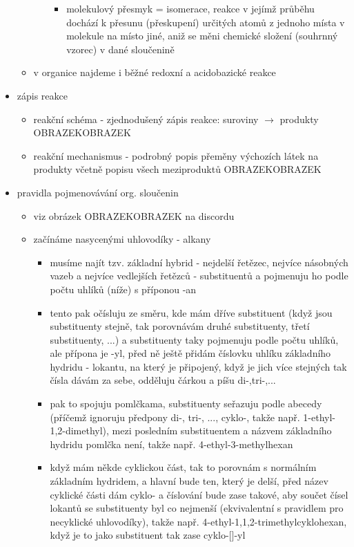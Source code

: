 \documentclass{article}
\begin{document}
\begin{itemize}
\begin{itemize}
\begin{itemize}
\begin{itemize}
\begin{enumerate}
        \end{enumerate}
        \item molekulový přesmyk = isomerace, reakce v jejímž průběhu dochází k přesunu (přeskupení) určitých atomů z jednoho místa v molekule na místo jiné, aniž se měni chemické složení (souhrnný vzorec) v dané sloučenině
      \end{itemize}
    \end{itemize}
    \item v organice najdeme i běžné redoxní a acidobazické reakce
  \end{itemize}
  \item zápis reakce
  \begin{itemize}
    \item reakční schéma - zjednodušený zápis reakce: suroviny $\rightarrow$ produkty OBRAZEKOBRAZEK
    \item reakční mechanismus - podrobný popis přeměny výchozích látek na produkty včetně popisu všech meziproduktů OBRAZEKOBRAZEK
  \end{itemize}
  \item pravidla pojmenovávání org. sloučenin
  \begin{itemize}
    \item viz obrázek OBRAZEKOBRAZEK na discordu
    \item začínáme nasycenými uhlovodíky - alkany
    \begin{itemize}
      \item musíme najít tzv. základní hybrid - nejdelší řetězec, nejvíce násobných vazeb a nejvíce vedlejších řetězců - substituentů a pojmenuju ho podle počtu uhlíků (níže) s příponou -an
      \item tento pak očísluju ze směru, kde mám dříve substituent (když jsou substituenty stejně, tak porovnávám druhé substituenty, třetí substituenty, ...) a substituenty taky pojmenuju podle počtu uhlíků, ale přípona je -yl, před ně ještě přidám číslovku uhlíku základního hydridu - lokantu, na který je připojený, když je jich více stejných tak čísla dávám za sebe, odděluju čárkou a píšu di-,tri-,...
      \item pak to spojuju pomlčkama, substituenty seřazuju podle abecedy (příčemž ignoruju předpony di-, tri-, ..., cyklo-, takže např. 1-ethyl-1,2-dimethyl), mezi posledním substituentem a názvem základního hydridu pomlčka není, takže např. 4-ethyl-3-methylhexan
      \item když mám někde cyklickou část, tak to porovnám s normálním základním hydridem, a hlavní bude ten, který je delší, před název cyklické části dám cyklo- a číslování bude zase takové, aby součet čísel lokantů se substituenty byl co nejmenší (ekvivalentní s pravidlem pro necyklické uhlovodíky), takže např. 4-ethyl-1,1,2-trimethylcyklohexan, když je to jako substituent tak zase cyklo-[]-yl

\end{itemize}
\end{itemize}
\end{itemize}
\end{document}
